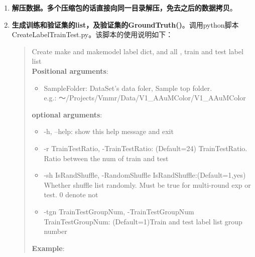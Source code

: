 \documentclass{article}
\begin{document}
\begin{CJK}{UTF8}{gbsn}
\begin{enumerate}
  \item \textbf{解压数据。多个压缩包的话直接向同一目录解压，免去之后的数据拷贝}。
  \item \textbf{生成训练和验证集的list，及验证集的GroundTruth(\color{red}{TODO item})}。调用python脚本CreateLabelTrainTest.py。该脚本的使用说明如下：\\
     \begin{quotation}
      Create make and makemodel label dict, and all , train and test label list\\
     \textbf{ Positional arguments}:
      \begin{itemize}
        \item SampleFolder: DataSet's data foler, Sample top folder.\\
                          e.g.: ～/Projects/Vmmr/Data/V1\_AAuMColor/V1\_AAuMColor \\
      \end{itemize}         
      \textbf{optional arguments}: \\
      \begin{itemize}
        \item  -h, --help:       show this help message and exit \\
        \item  -r TrainTestRatio, -TrainTestRatio: (Default=24) TrainTestRatio. Ratio between the num of train and test \\
        \item  -sh IsRandShuffle, -RandomShuffle IsRandShuffle:(Default=1,yes) Whether shuffle list randomly. Must be true 
                                for multi-round exp or test. 0 denote not\\
        \item  -tgn TrainTestGroupNum, -TrainTestGroupNum TrainTestGroupNum: (Default=1)Train and test label list group number \\ 
      \end{itemize}
      \textbf{Example}: \\
      \textit{\color{blue}{CreateLabelTrainTest.py $\sim$/Projects/Vmmr/Data/V1\_AAuMColor/V1\_AAuMColor}}
     \end{quotation}
       

\end{enumerate}
\end{CJK}
\end{document}
